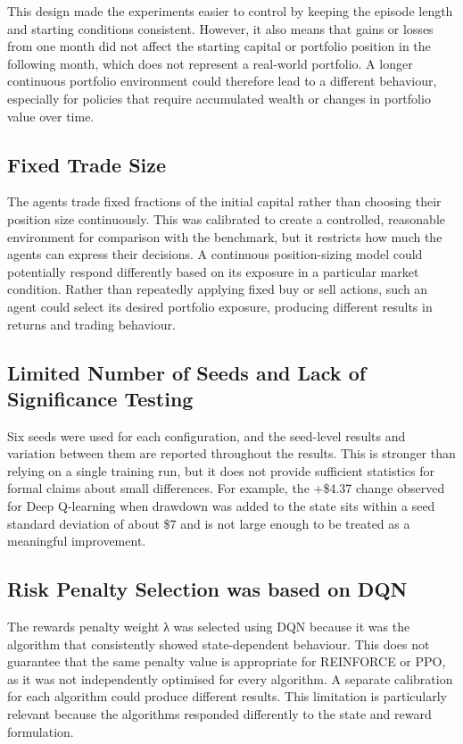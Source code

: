 This design made the experiments easier to control by keeping the
episode length and starting conditions consistent. However, it also
means that gains or losses from one month did not affect the starting
capital or portfolio position in the following month, which does not
represent a real-world portfolio. A longer continuous portfolio
environment could therefore lead to a different behaviour, especially
for policies that require accumulated wealth or changes in portfolio
value over time.

\subsection{Fixed Trade Size}

The agents trade fixed fractions of the initial capital rather than
choosing their position size continuously. This was calibrated to create
a controlled, reasonable environment for comparison with the benchmark,
but it restricts how much the agents can express their decisions. A
continuous position-sizing model could potentially respond differently
based on its exposure in a particular market condition. Rather than
repeatedly applying fixed buy or sell actions, such an agent could
select its desired portfolio exposure, producing different results in
returns and trading behaviour.

\subsection{Limited Number of Seeds and Lack of Significance Testing}

Six seeds were used for each configuration, and the seed-level results
and variation between them are reported throughout the results. This is
stronger than relying on a single training run, but it does not provide
sufficient statistics for formal claims about small differences. For
example, the +\$4.37 change observed for Deep Q-learning when drawdown
was added to the state sits within a seed standard deviation of about
\$7 and is not large enough to be treated as a meaningful improvement.

\subsection{Risk Penalty Selection was based on DQN}

The reward\textquotesingle s penalty weight λ was selected using DQN
because it was the algorithm that consistently showed state-dependent
behaviour. This does not guarantee that the same penalty value is
appropriate for REINFORCE or PPO, as it was not independently optimised
for every algorithm. A separate calibration for each algorithm could
produce different results. This limitation is particularly relevant
because the algorithms responded differently to the state and reward
formulation.

